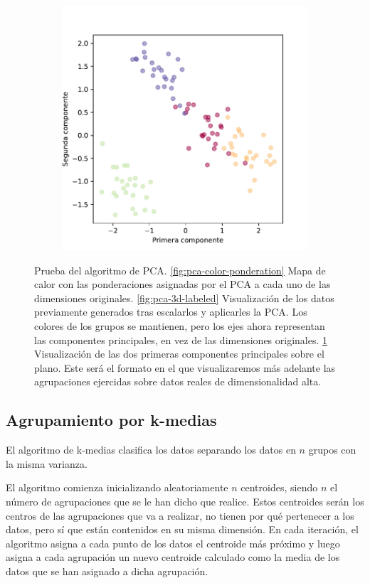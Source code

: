 \begin{figure}[]
\begin{subfigure}{0.45\textwidth}
    \includegraphics[width=\textwidth]{figures/pca-labeled.pdf}
    \caption{}
    \label{fig:pca-labeled}
  \end{subfigure}
  \caption[Prueba del algoritmo de PCA.]{Prueba del algoritmo de PCA. \ref{fig:pca-color-ponderation} Mapa de calor con las ponderaciones asignadas por el PCA a cada uno de las dimensiones originales. \ref{fig:pca-3d-labeled} Visualización de los datos previamente generados tras escalarlos y aplicarles la PCA. Los colores de los grupos se mantienen, pero los ejes ahora representan las componentes principales, en vez de las dimensiones originales. \ref{fig:pca-labeled} Visualización de las dos primeras componentes principales sobre el plano. Este será el formato en el que visualizaremos más adelante las agrupaciones ejercidas sobre datos reales de dimensionalidad alta.}
  \label{fig:pca}
\end{figure}

\newpage
\subsection{Agrupamiento por k-medias}

El algoritmo de k-medias clasifica los datos separando los datos en $ n $ grupos con la misma varianza.

El algoritmo comienza inicializando aleatoriamente $ n $ centroides, siendo $ n $ el número de agrupaciones que se le han dicho que realice. Estos centroides serán los centros de las agrupaciones que va a realizar, no tienen por qué pertenecer a los datos, pero sí que están contenidos en su misma dimensión. En cada iteración, el algoritmo asigna a cada punto de los datos el centroide más próximo y luego asigna a cada agrupación un nuevo centroide calculado como la media de los datos que se han asignado a dicha agrupación.


